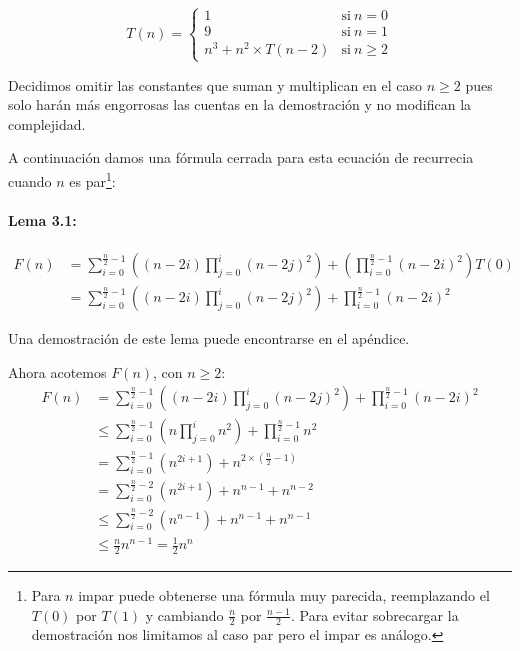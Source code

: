 \begin{equation}
 \label{eq:aqui-le-mostramos-como-hacerle-la-llave-grande}
 T(n) = \left\{
     \begin{array}{ll}
 1      & \mathrm{si\ } n = 0 \\
 9      & \mathrm{si\ } n = 1 \\
 n^3 + n^2\times T(n-2) & \mathrm{si\ } n \geq 2
     \end{array}
   \right.
\end{equation}

Decidimos omitir las constantes que suman y multiplican en el caso $n\geq 2$ pues solo harán más engorrosas las cuentas en la demostración y no modifican la complejidad.

A continuación damos una fórmula cerrada para esta ecuación de recurrecia cuando $n$ es par\footnote{Para $n$ impar puede obtenerse una fórmula muy parecida, reemplazando el $T(0)$ por $T(1)$ y cambiando $\frac{n}{2}$ por $\frac{n-1}{2}$. Para evitar sobrecargar la demostración nos limitamos al caso par pero el impar es análogo.}:

\paragraph{Lema 3.1:} 
\begin{equation}
\begin{aligned}
  F(n) &= \sum_{i=0}^{\frac{n}{2}-1} \left((n-2i) \prod_{j=0}^{i}(n-2j)^2\right) + \left(\prod_{i=0}^{\frac{n}{2}-1}(n-2i)^2\right) T(0)\\
  &= \sum_{i=0}^{\frac{n}{2}-1} \left((n-2i) \prod_{j=0}^{i}(n-2j)^2\right) + \prod_{i=0}^{\frac{n}{2}-1}(n-2i)^2
\end{aligned}
\end{equation}

Una demostración de este lema puede encontrarse en el apéndice.

  Ahora acotemos $F(n)$, con $n \geq 2$:
  \begin{equation}
  \begin{aligned}
  F(n) &= \sum_{i=0}^{\frac{n}{2}-1} \left((n-2i) \prod_{j=0}^{i}(n-2j)^2\right) + \prod_{i=0}^{\frac{n}{2}-1}(n-2i)^2 \\
  &\leq \sum_{i=0}^{\frac{n}{2}-1} \left(n \prod_{j=0}^{i}n^2\right) + \prod_{i=0}^{\frac{n}{2}-1}n^2 \\
  &= \sum_{i=0}^{\frac{n}{2}-1} (n^{2i+1}) + n^{2\times(\frac{n}{2}-1)} \\
  &= \sum_{i=0}^{\frac{n}{2}-2} (n^{2i+1}) + n^{n-1} + n^{n-2} \\
  &\leq \sum_{i=0}^{\frac{n}{2}-2} (n^{n-1}) + n^{n-1} + n^{n-1} \\
  &\leq \frac{n}{2} n^{n-1} 
  = \frac{1}{2} n^{n}
  \end{aligned}
  \end{equation}

